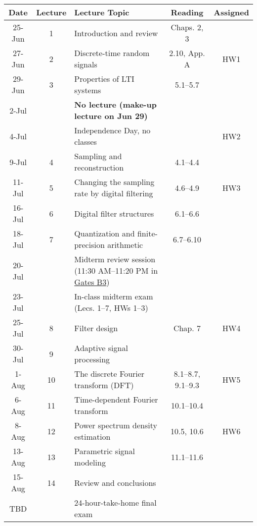 \begin{tabular}{c|c|l|c|c}
	\hline
	Date & Lecture	& Lecture Topic	& Reading\footnotemark & Assigned \\
	\hline
	25-Jun	& 1 &	Introduction and review			& Chaps. 2, 3	& \\
	27-Jun	& 2 &	Discrete-time random signals	& 2.10, App. A & HW1\\
	29-Jun 	& 3 & 	Properties of LTI systems 		& 5.1--5.7 	&  \\
	\hline
	2-Jul	& 	& 	\textbf{No lecture (make-up lecture on Jun 29)}	&  & \\
	4-Jul	&  & 	Independence Day, no classes  	&		& HW2 \\
	\hline
	9-Jul	& 4 & 	Sampling and reconstruction  	& 4.1--4.4 	& \\
	11-Jul	& 5	& 	Changing the sampling rate by digital filtering	& 4.6--4.9 		& HW3 \\
	\hline
	16-Jul	& 6	& 	Digital filter structures				& 6.1--6.6 & \\
	18-Jul	& 7	& 	Quantization and finite-precision arithmetic &	6.7--6.10	& \\
	20-Jul	& 	& 	Midterm review session (11:30 AM--11:20 PM in \href{https://campus-map.stanford.edu/?srch=Gates+Computer+Science}{Gates B3})  & & \\
	\hline
	23-Jul	& 	& 	In-class midterm exam (Lecs. 1--7, HWs 1--3) & & \\
	25-Jul	& 8	& 	Filter design & Chap. 7	& HW4 \\
	\hline
	30-Jul	& 9 & 	Adaptive signal processing & & \\
	1-Aug	& 10 & 	The discrete Fourier transform (DFT) & 8.1--8.7, 9.1--9.3	& HW5 \\
	\hline
	6-Aug	& 11 & 	Time-dependent Fourier transform	& 10.1--10.4 & \\
	8-Aug	& 12 & 	Power spectrum density estimation & 10.5, 10.6 & HW6 \\
	\hline
	13-Aug	& 13 & 	Parametric signal modeling 	& 11.1--11.6	& \\
	15-Aug 	& 14 & 	Review and conclusions &  & 	\\
	TBD	& 	 & 	24-hour-take-home final exam & \\
	\hline
\end{tabular}